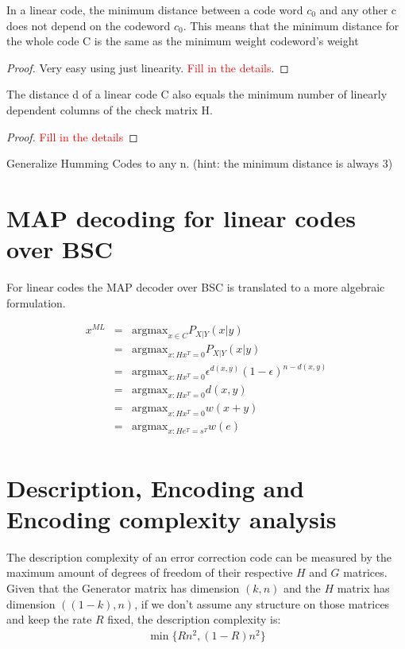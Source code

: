 \begin{theorem}
	In a linear code, the minimum distance between a code word $c_0$  and any other c does not depend on the codeword $c_0$. This means that the minimum distance for the whole code C is the same as the minimum weight codeword's weight
\end{theorem}
\begin{proof}
	Very easy using just linearity. \textcolor{red}{Fill in the details}.
\end{proof}

\begin{theorem}
The distance d of a linear code C also equals the minimum number of linearly dependent columns of the check matrix H.
\end{theorem}
\begin{proof}
	\textcolor{red}{Fill in the details}
\end{proof}

\begin{example}[Exercise]
	Generalize Humming Codes to any n. (hint: the minimum distance is always 3)
\end{example}

\section{MAP decoding for linear codes over BSC}

For linear codes the MAP decoder over BSC is translated to a more algebraic formulation.

\begin{eqnarray}
	x^{ML} &=& \text{argmax}_{x \in C} P_{X|Y}(x|y) \\
	&=& \text{argmax}_{x: Hx^T=0} P_{X|Y}(x|y) \\
	&=& \text{argmax}_{x: Hx^T=0} \epsilon^{d(x,y)}(1-\epsilon)^{n-d(x,y)} \\
	&=& \text{argmax}_{x: Hx^T=0} d(x, y) \\
	&=& \text{argmax}_{x: Hx^T=0} w(x + y) \\
	&=& \text{argmax}_{x: He^T=s^T} w(e) \\
\end{eqnarray}
\section{Description, Encoding and Encoding complexity analysis}
The description complexity of an error correction code can be measured by the maximum amount of degrees of freedom of their respective $H$ and $G$ matrices.
Given that the Generator matrix has dimension $(k, n)$ and the $H$ matrix has dimension $((1-k), n)$, if we don't assume any structure on those matrices and keep the rate $R$ fixed, the description complexity is:
\begin{eqnarray}
	\min\{Rn^2, (1-R)n^2\}
\end{eqnarray}

